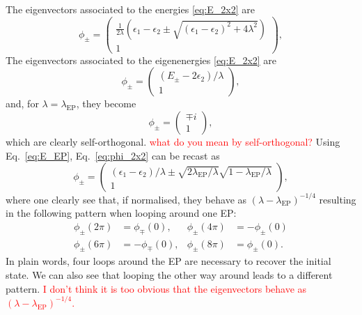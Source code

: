 \documentclass[11pt,a4paper]{article}
\newcommand{\titou}[1]{\textcolor{red}{#1}}
\begin{document}
The eigenvectors associated to the energies \eqref{eq:E_2x2} are
\begin{equation}\label{ev2x2}
\phi_{\pm}=\begin{pmatrix}
\frac{1}{2\lambda}(\epsilon_1 - \epsilon_2 \pm \sqrt{(\epsilon_1 - \epsilon_2)^2 + 4\lambda^2}) \\ 1
\end{pmatrix},
\end{equation}
The eigenvectors associated to the eigenenergies \eqref{eq:E_2x2} are
\begin{equation} \label{eq:phi_2x2}
\phi_{\pm}=
	\begin{pmatrix}
		(E_{\pm}-2\epsilon_2)/\lambda
		\\ 
		1
	\end{pmatrix},
\end{equation}
and, for $\lambda=\lambda_\text{EP}$, they become
\begin{equation}
\phi_{\pm}=\begin{pmatrix}
\mp i \\ 1
\end{pmatrix},
\end{equation}
which are clearly self-orthogonal. 
\titou{what do you mean by self-orthogonal?}
Using Eq.~\eqref{eq:E_EP}, Eq.~\eqref{eq:phi_2x2} can be recast as
\begin{equation}
\phi_{\pm}=
	\begin{pmatrix}
		(\epsilon_1-\epsilon_2)/\lambda \pm \sqrt{2\lambda_\text{EP}/\lambda} \sqrt{1 - \lambda_\text{EP}/\lambda} 
		\\ 
		1
	\end{pmatrix},
\end{equation}
where one clearly see that, if normalised, they behave as $(\lambda - \lambda_\text{EP})^{-1/4}$ resulting in the following pattern when looping around one EP:
\begin{align}
	\phi_{\pm}(2\pi) & = \phi_{\mp}(0),
	&
	\phi_{\pm}(4\pi) & = -\phi_{\pm}(0) \\
	\phi_{\pm}(6\pi) & = -\phi_{\mp}(0),
	&
	\phi_{\pm}(8\pi) & = \phi_{\pm}(0).
\end{align}
In plain words, four loops around the EP are necessary to recover the initial state. 
We can also see that looping the other way around leads to a different pattern.
\titou{I don't think it is too obvious that the eigenvectors behave as $(\lambda - \lambda_\text{EP})^{-1/4}$.}



\end{document}
